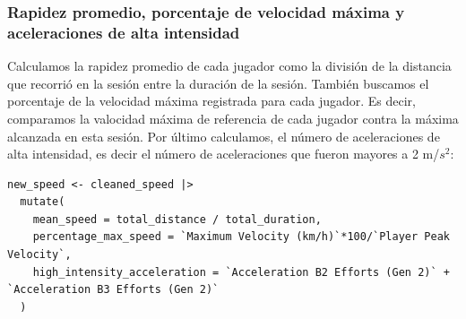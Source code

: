 \subsubsection*{Rapidez promedio, porcentaje de velocidad máxima y aceleraciones de alta intensidad}
Calculamos la rapidez promedio de cada jugador como la división de la distancia que recorrió en la
sesión entre la duración de la sesión. También buscamos el porcentaje de la velocidad máxima
registrada para cada jugador. Es decir, comparamos la valocidad máxima de referencia de cada jugador
contra la máxima alcanzada en esta sesión. Por último calculamos, el número de aceleraciones de alta
intensidad, es decir el número de aceleraciones que fueron mayores a 2 m/$s^2$:
\begin{verbatim}
new_speed <- cleaned_speed |>
  mutate(
    mean_speed = total_distance / total_duration,
    percentage_max_speed = `Maximum Velocity (km/h)`*100/`Player Peak Velocity`,
    high_intensity_acceleration = `Acceleration B2 Efforts (Gen 2)` + `Acceleration B3 Efforts (Gen 2)`
  )
\end{verbatim}

